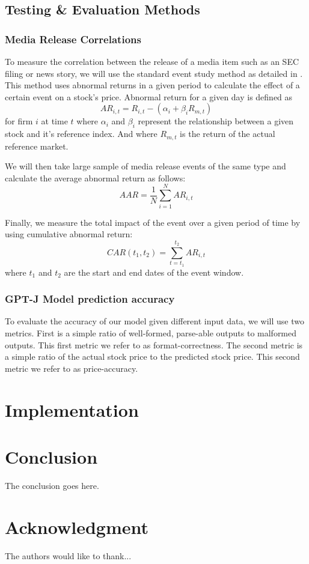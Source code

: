 \documentclass[conference]{IEEEtran}
\begin{document}
\subsection{Testing \& Evaluation Methods}
\subsubsection{Media Release Correlations}
To measure the correlation between the release of a media item such as an SEC filing or news story, we will use the standard event study method as detailed in \cite{Neuhierl2010}. This method uses abnormal returns in a given period to calculate the effect of a certain event on a stock's price. Abnormal return for a given day is defined as 
\begin{equation}
	AR_{i,t}=R_{i,t}-(\alpha_i+\beta_i R_{m,t})
\end{equation}
for firm $i$ at time $t$ where $\alpha_i$ and $\beta_i$ represent the relationship between a given stock and it's reference index. And where $R_{m,t}$ is the return of the actual reference market.

We will then take large sample of media release events of the same type and calculate the average abnormal return as follows:
\begin{equation}
	AAR= \frac{1}{N} \sum\limits_{i=1}^{N}AR_{i,t}
\end{equation}

Finally, we measure the total impact of the event over a given period of time by using cumulative abnormal return:
\begin{equation}
	CAR(t_1,t_2)=\sum\limits_{t=t_1}^{t_2} AR_{i,t} 
\end{equation}
where $t_1$ and $t_2$ are the start and end dates of the event window.
\subsubsection{GPT-J Model prediction accuracy}
To evaluate the accuracy of our model given different input data, we will use two metrics. First is a simple ratio of well-formed, parse-able outputs to malformed outputs. This first metric we refer to as format-correctness. The second metric is a simple ratio of the actual stock price to the predicted stock price. This second metric we refer to as price-accuracy.
\section{Implementation}
\section{Conclusion}
The conclusion goes here.

\section*{Acknowledgment}
The authors would like to thank... 




\end{document}
